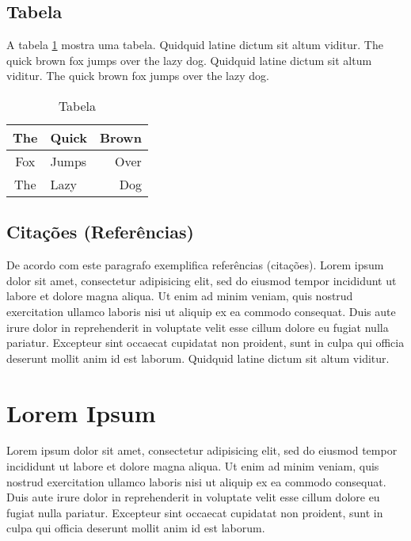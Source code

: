 \subsection{Tabela}

A tabela \ref{tab:tabela} mostra uma tabela. Quidquid latine dictum sit altum
viditur. The quick brown fox jumps over the lazy dog. Quidquid latine dictum
sit altum viditur. The quick brown fox jumps over the lazy dog.

\begin{table}[htbp]
	\caption{Tabela}
	\label{tab:tabela}
	\centering
	\begin{tabular}{|c|l|r|}
		\hline
		The 	&	Quick 	&	Brown	\\
		\hline
		Fox	&	Jumps	&	Over	\\
		The	&	Lazy	&	Dog	\\
		\hline 
	\end{tabular}
\end{table} 


\subsection{Citações (Referências)}

De acordo com \cite{DEAD:1666,BEEF:1234} este paragrafo exemplifica referências
(citações). Lorem ipsum dolor sit amet, consectetur adipisicing elit, sed do
eiusmod tempor incididunt ut labore et dolore magna aliqua. Ut enim ad minim
veniam, quis nostrud exercitation ullamco laboris nisi ut aliquip ex ea commodo
consequat. Duis aute irure dolor in reprehenderit in voluptate velit esse
cillum dolore eu fugiat nulla pariatur. Excepteur sint occaecat cupidatat non
proident, sunt in culpa qui officia deserunt mollit anim id est laborum.
Quidquid latine dictum sit altum viditur.




\section{Lorem Ipsum}

Lorem ipsum dolor sit amet, consectetur adipisicing elit, sed do eiusmod tempor
incididunt ut labore et dolore magna aliqua. Ut enim ad minim veniam, quis
nostrud exercitation ullamco laboris nisi ut aliquip ex ea commodo consequat.
Duis aute irure dolor in reprehenderit in voluptate velit esse cillum dolore eu
fugiat nulla pariatur. Excepteur sint occaecat cupidatat non proident, sunt in
culpa qui officia deserunt mollit anim id est laborum.

